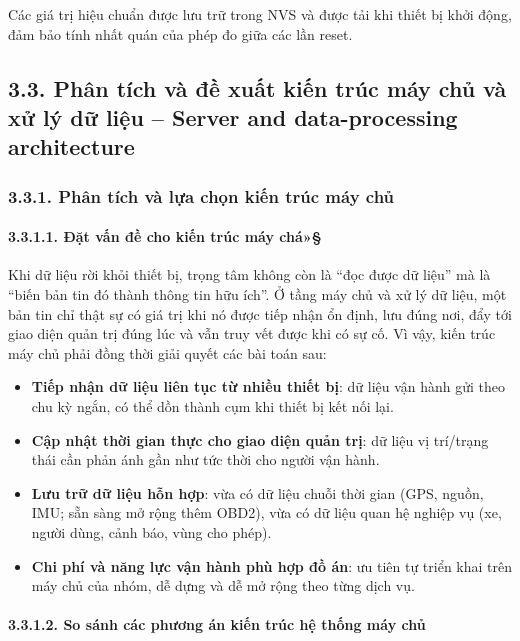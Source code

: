 \documentclass[a4paper]{extarticle}
\providecommand{\tightlist}{%
  \setlength{\itemsep}{0pt}\setlength{\parskip}{0pt}}
\begin{document}
Các giá trị hiệu chuẩn được lưu trữ trong NVS và được tải khi thiết bị
khởi động, đảm bảo tính nhất quán của phép đo giữa các lần reset.

\subsection{3.3. Phân tích và đề xuất kiến trúc máy chủ và xử lý dữ
liệu -- Server and data-processing architecture}\label{33-phan-tich-va-de-xuat-kien-truc-backend-cloud}

\subsubsection{3.3.1. Phân tích và lựa chọn kiến trúc máy chủ}

\paragraph{3.3.1.1. Đặt vấn đề cho kiến trúc máy
chá»§}\label{3131-ux111ux1eb7t-vux1ea5n-ux111ux1ec1-cho-kiux1ebfn-truxfac-cloud}

Khi dữ liệu rời khỏi thiết bị, trọng tâm không còn là ``đọc được dữ
liệu'' mà là ``biến bản tin đó thành thông tin hữu ích''. Ở tầng
máy chủ và xử lý dữ liệu, một bản tin chỉ thật sự có giá trị khi nó được tiếp nhận
ổn định, lưu đúng nơi, đẩy tới giao diện quản trị đúng lúc và vẫn truy vết được
khi có sự cố. Vì vậy, kiến trúc máy chủ phải đồng thời giải quyết các bài
toán sau:

\begin{itemize}
\tightlist
\item
  \textbf{Tiếp nhận dữ liệu liên tục từ nhiều thiết bị}: dữ liệu vận hành
  gửi theo chu kỳ ngắn, có thể dồn thành cụm khi thiết bị kết nối lại.
\item
  \textbf{Cập nhật thời gian thực cho giao diện quản trị}: dữ liệu vị trí/trạng
  thái cần phản ánh gần như tức thời cho người vận hành.
\item
  \textbf{Lưu trữ dữ liệu hỗn hợp}: vừa có dữ liệu chuỗi thời gian (GPS,
  nguồn, IMU; sẵn sàng mở rộng thêm OBD2), vừa có dữ liệu quan hệ nghiệp
  vụ (xe, người dùng, cảnh báo, vùng cho phép).
\item
  \textbf{Chi phí và năng lực vận hành phù hợp đồ án}: ưu tiên
  tự triển khai trên máy chủ của nhóm, dễ dựng và dễ mở rộng theo từng dịch vụ.
\end{itemize}

\paragraph{3.3.1.2. So sánh các phương án kiến trúc
hệ thống máy chủ}\label{3132-so-suxe1nh-cuxe1c-phux1b0ux1a1ng-uxe1n-kiux1ebfn-truxfac-cloud}
\end{document}
